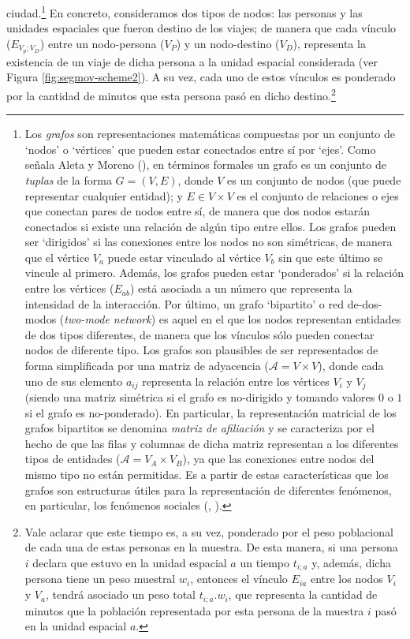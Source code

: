 \documentclass[
  spanish,
  a4paper,%
  chapterprefix=true,%
  DIV=calc,%
  twoside]{scrbook}%
\begin{document}
ciudad.\footnote{Los
  \emph{grafos} son representaciones
  matemáticas compuestas por un conjunto de `nodos' o `vértices' que
  pueden estar conectados entre sí por `ejes'. Como señala Aleta y Moreno (),
  en términos formales un grafo es un conjunto de \emph{tuplas} de la forma
  \(G = (V,E)\), donde \(V\) es un conjunto de nodos (que puede
  representar cualquier entidad); y \(E \in V \times V\) es el conjunto
  de relaciones o ejes que conectan pares de nodos entre sí, de manera
  que dos nodos estarán conectados si existe una relación de algún
  tipo entre ellos. Los grafos pueden ser `dirigidos' si las
  conexiones entre los nodos no son simétricas, de manera que el
  vértice \(V_a\) puede estar vinculado al vértice \(V_b\) sin que este
  último se vincule al primero. Además, los grafos pueden estar
  `ponderados' si la relación entre los vértices (\(E_{ab}\)) está
  asociada a un número que representa la intensidad de la interacción.
  Por último, un grafo `bipartito' o red de-dos-modos (\emph{two-mode
  network}) es aquel en el que los nodos representan entidades de dos
  tipos diferentes, de manera que los vínculos sólo pueden conectar
  nodos de diferente tipo. Los grafos son plausibles de ser
  representados de forma simplificada por una matriz de adyacencia
  (\(\mathscr{A} = V \times V\)), donde cada uno de sus elemento
  \(a_{ij}\) representa la relación entre los vértices \(V_i\) y \(V_j\)
  (siendo una matriz simétrica si el grafo es no-dirigido y tomando
  valores \(0\) o \(1\) si el grafo es no-ponderado). En particular, la
  representación matricial de los grafos bipartitos se denomina
  \emph{matriz de afiliación} y se caracteriza por el hecho de que las
  filas y columnas de dicha matriz representan a los diferentes tipos
  de entidades (\(\mathscr{A} = V_A \times V_B\)), ya que las conexiones
  entre nodos del mismo tipo no están permitidas. Es a partir de estas
  características que los grafos son estructuras útiles para la
  representación de diferentes fenómenos, en particular, los fenómenos
  sociales (, ).} En concreto, consideramos dos
tipos de nodos: las personas y las unidades espaciales que fueron
destino de los viajes; de manera que cada vínculo (\(E_{V_p;V_D}\)) entre
un nodo-persona (\(V_P\)) y un nodo-destino (\(V_D\)), representa la
existencia de un viaje de dicha persona a la unidad espacial considerada
(ver Figura \ref{fig:segmov-scheme2}). A su vez, cada uno de estos
vínculos es ponderado por la cantidad de minutos que esta persona pasó
en dicho destino.\footnote{Vale aclarar que este tiempo es, a su
  vez, ponderado por el peso poblacional de cada una de estas personas
  en la muestra. De esta manera, si una persona \(i\) declara que estuvo
  en la unidad espacial \(a\) un tiempo \(t_{i;a}\) y, además, dicha
  persona tiene un peso muestral \(w_i\), entonces el vínculo \(E_{ia}\)
  entre los nodos \(V_i\) y \(V_a\), tendrá asociado un peso total
  \(t_{i;a}.w_i\), que representa la cantidad de minutos que la
  población representada por esta persona de la muestra \(i\) pasó en la
  unidad espacial \(a\).}
\end{document}
